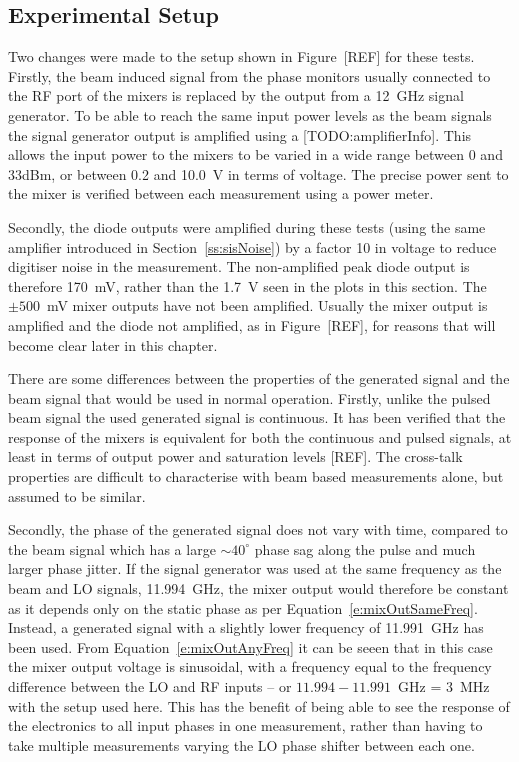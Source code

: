 \subsection{Experimental Setup}
\label{ss:sigGenSetup}

Two changes were made to the setup shown in Figure~[REF] for these tests. Firstly, the beam induced signal from the phase monitors usually connected to the RF port of the mixers is replaced by the output from a 12~GHz signal generator. To be able to reach the same input power levels as the beam signals the signal generator output is amplified using a [TODO:amplifierInfo]. This allows the input power to the mixers to be varied in a wide range between 0 and 33dBm, or between 0.2 and 10.0~V in terms of voltage. The precise power sent to the mixer is verified between each measurement using a power meter. 

Secondly, the diode outputs were amplified during these tests (using the same amplifier introduced in Section~\ref{ss:sisNoise}) by a factor 10 in voltage to reduce digitiser noise in the measurement. The non-amplified peak diode output is therefore 170~mV, rather than the 1.7~V seen in the plots in this section. The \(\pm500\)~mV mixer outputs have not been amplified. Usually the mixer output is amplified and the diode not amplified, as in Figure~[REF], for reasons that will become clear later in this chapter.

There are some differences between the properties of the generated signal and the beam signal that would be used in normal operation. Firstly, unlike the pulsed beam signal the used generated signal is continuous. It has been verified that the response of the mixers is equivalent for both the continuous and pulsed signals, at least in terms of output power and saturation levels [REF]. The cross-talk properties are difficult to characterise with beam based measurements alone, but assumed to be similar.

Secondly, the phase of the generated signal does not vary with time, compared to the beam signal which has a large \(\sim40^\circ\) phase sag along the pulse and much larger phase jitter. If the signal generator was used at the same frequency as the beam and LO signals, 11.994~GHz, the mixer output would therefore be constant as it depends only on the static phase as per Equation~\ref{e:mixOutSameFreq}. Instead, a generated signal with a slightly lower frequency of 11.991~GHz has been used. From Equation~\ref{e:mixOutAnyFreq} it can be seeen that in this case the mixer output voltage is sinusoidal, with a frequency equal to the frequency difference between the LO and RF inputs -- or \(11.994-11.991\)~GHz = 3~MHz with the setup used here. This has the benefit of being able to see the response of the electronics to all input phases in one measurement, rather than having to take multiple measurements varying the LO phase shifter between each one.

